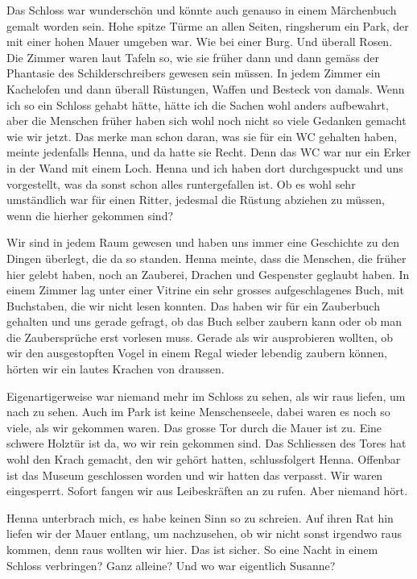 Das Schloss war wunderschön und könnte auch genauso in einem Märchenbuch gemalt worden sein. Hohe spitze Türme an allen Seiten, ringsherum ein Park, der mit einer hohen Mauer umgeben war. Wie bei einer Burg. Und überall Rosen. Die Zimmer waren laut Tafeln so, wie sie früher dann und dann gemäss der Phantasie des Schilderschreibers gewesen sein müssen. In jedem Zimmer ein Kachelofen und dann überall Rüstungen, Waffen und Besteck von damals. Wenn ich so ein Schloss gehabt hätte, hätte ich die Sachen wohl anders aufbewahrt, aber die Menschen früher haben sich wohl noch nicht so viele Gedanken gemacht wie wir jetzt. Das merke man schon daran, was sie für ein WC gehalten haben, meinte jedenfalls Henna, und da hatte sie Recht. Denn das WC war nur ein Erker in der Wand mit einem Loch. Henna und ich haben dort durchgespuckt und uns vorgestellt, was da sonst schon alles runtergefallen ist. Ob es wohl sehr umständlich war für einen Ritter, jedesmal die Rüstung abziehen zu müssen, wenn die hierher gekommen sind?

Wir sind in jedem Raum gewesen und haben uns immer eine Geschichte zu den Dingen überlegt, die da so standen. Henna meinte, dass die Menschen, die früher hier gelebt haben, noch an Zauberei, Drachen und Gespenster geglaubt haben. In einem Zimmer lag unter einer Vitrine ein sehr grosses aufgeschlagenes Buch, mit Buchstaben, die wir nicht lesen konnten. Das haben wir für ein Zauberbuch gehalten und uns gerade gefragt, ob das Buch selber zaubern kann oder ob man die Zaubersprüche erst vorlesen muss. Gerade als wir ausprobieren wollten, ob wir den ausgestopften Vogel in einem Regal wieder lebendig zaubern können, hörten wir ein lautes Krachen von draussen.

Eigenartigerweise war niemand mehr im Schloss zu sehen, als wir raus liefen, um
nach zu sehen. Auch im Park ist keine Menschenseele, dabei waren es noch so
viele, als wir gekommen waren. Das grosse Tor durch die Mauer ist zu. Eine
schwere Holztür ist da, wo wir rein gekommen sind. Das Schliessen des Tores hat
wohl den Krach gemacht, den wir gehört hatten, schlussfolgert Henna. Offenbar
ist das Museum geschlossen worden und wir hatten das verpasst. Wir waren
eingesperrt. Sofort fangen wir aus Leibeskräften an zu rufen. Aber niemand
hört. 

Henna unterbrach mich, es habe keinen Sinn so zu schreien. Auf ihren Rat hin liefen wir der Mauer entlang, um nachzusehen, ob wir nicht sonst irgendwo raus kommen, denn raus wollten wir hier. Das ist sicher. So eine Nacht in einem Schloss verbringen? Ganz alleine? Und wo war eigentlich Susanne? 

